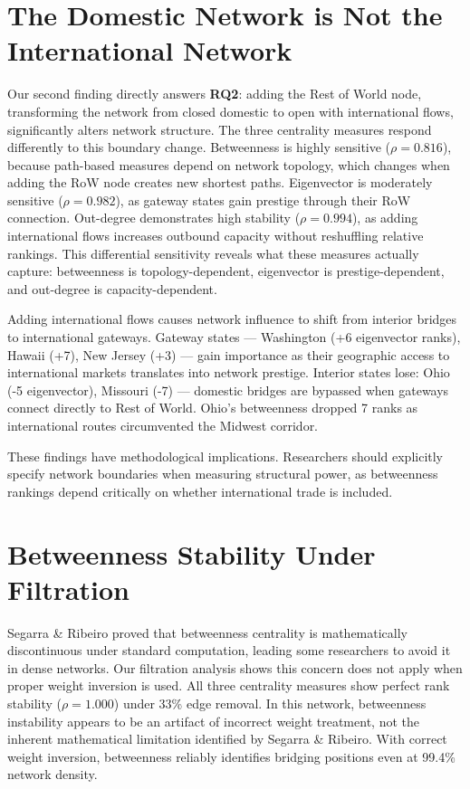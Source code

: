 \documentclass[12pt,oneside]{book}
\begin{document}
\section{The Domestic Network is Not the International Network}

Our second finding directly answers \textbf{RQ2}: adding the Rest of World node, transforming the network from closed domestic to open with international flows, significantly alters network structure. The three centrality measures respond differently to this boundary change. Betweenness is highly sensitive ($\rho = 0.816$), because path-based measures depend on network topology, which changes when adding the RoW node creates new shortest paths. Eigenvector is moderately sensitive ($\rho = 0.982$), as gateway states gain prestige through their RoW connection. Out-degree demonstrates high stability ($\rho = 0.994$), as adding international flows increases outbound capacity without reshuffling relative rankings. This differential sensitivity reveals what these measures actually capture: betweenness is topology-dependent, eigenvector is prestige-dependent, and out-degree is capacity-dependent.

Adding international flows causes network influence to shift from interior bridges to international gateways. Gateway states --- Washington (+6 eigenvector ranks), Hawaii (+7), New Jersey (+3) --- gain importance as their geographic access to international markets translates into network prestige. Interior states lose: Ohio (-5 eigenvector), Missouri (-7) --- domestic bridges are bypassed when gateways connect directly to Rest of World. Ohio's betweenness dropped 7 ranks as international routes circumvented the Midwest corridor.

These findings have methodological implications. Researchers should explicitly specify network boundaries when measuring structural power, as betweenness rankings depend critically on whether international trade is included.


\section{Betweenness Stability Under Filtration}

Segarra \& Ribeiro \cite{segarra_stability_2015} proved that betweenness centrality is mathematically discontinuous under standard computation, leading some researchers to avoid it in dense networks. Our filtration analysis shows this concern does not apply when proper weight inversion is used. All three centrality measures show perfect rank stability ($\rho = 1.000$) under 33\% edge removal. In this network, betweenness instability appears to be an artifact of incorrect weight treatment, not the inherent mathematical limitation identified by Segarra \& Ribeiro. With correct weight inversion, betweenness reliably identifies bridging positions even at 99.4\% network density.
\end{document}
